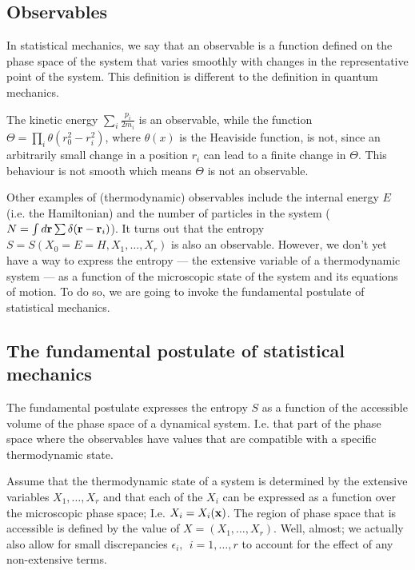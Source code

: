 \subsection{Observables}
In statistical mechanics, we say that an observable is a function defined on the phase space of the system that varies smoothly with changes in the representative point of the system. This definition is different to the definition in quantum mechanics.

The kinetic energy $\sum_i \frac{p_i}{2m_i}$ is an observable, while the function $\Theta = \prod_i \theta(r_0^2-r_i^2)$, where $\theta(x)$ is the Heaviside function, is not, since an arbitrarily small change in a position $r_i$ can lead to a finite change in $\Theta$. This behaviour is not smooth which means $\Theta$ is not an observable.

Other examples of (thermodynamic) observables include the internal energy $E$ (i.e. the Hamiltonian) and the number of particles in the system ($N = \int d{\bf r}\sum\delta({\bf r}-{\bf r}_i)$).
It turns out that the entropy $S=S(X_0=E=H,X_1,\ldots,X_r)$ is also an observable. However, we don't yet have a way to express the entropy --- the extensive variable of a thermodynamic system --- as a function of the microscopic state of the system and its equations of motion. To do so, we are going to invoke the fundamental postulate of statistical mechanics.

\subsection{The fundamental postulate of statistical mechanics}
The fundamental postulate expresses the entropy $S$ as a function of the accessible volume of the phase space of a dynamical system. I.e. that part of the phase space where the observables have values that are compatible with a specific thermodynamic state.

Assume that the thermodynamic state of a system is determined by the extensive variables $X_1,\ldots,X_r$ and that each of the $X_i$ can be expressed as a function over the microscopic phase space; I.e. $X_i = X_i({\bf x})$.
The region of phase space that is accessible is defined by the value of $X = (X_1,\ldots,X_r)$. Well, almost; we actually also allow for small discrepancies $\epsilon_i,~~i=1,\ldots,r$ to account for the effect of any non-extensive terms.


